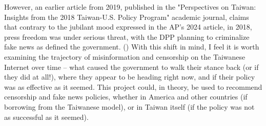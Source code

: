 However, an earlier article from 2019, published in the "Perspectives on Taiwan: Insights from the 2018 Taiwan-U.S. Policy Program" academic journal, claims
that contrary to the jubilant mood expressed in the AP's 2024 article, in 2018, press freedom was under serious threat, with the DPP planning to criminalize
fake news as defined the government. (\cite{perspectives-taiwan}) With this shift in mind, I feel it is worth examining the trajectory of misinformation
and censorship on the Taiwanese Internet over time -- what caused the government to walk their stance back (or if they did at all!), where they appear to be
heading right now, and if their policy was as effective as it seemed. This project could, in theory, be used to recommend censorship and fake news policies,
whether in America and other countries (if borrowing from the Taiwanese model), or in Taiwan itself (if the policy was not as successful as it seemed).